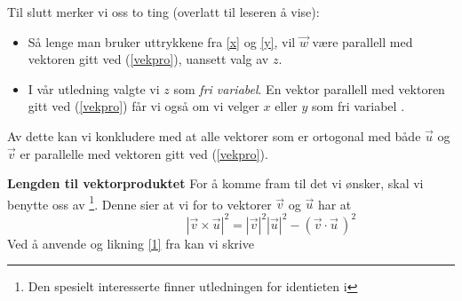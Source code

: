 {Til slutt merker vi oss to ting (overlatt til leseren å vise):
\begin{itemize}
\item Så lenge man bruker uttrykkene fra \eqref{x} og \eqref{y}, vil $ \vec{w} $ være parallell med vektoren gitt ved (\ref{vekpro}), uansett valg av $ z $.
\item I vår utledning valgte vi $z$ som \textit{fri variabel}. En vektor parallell med vektoren gitt ved (\ref{vekpro}) får vi også om vi velger $ x $ eller $ y $ som fri variabel .
\end{itemize}
\label{allekrypropar} Av dette kan vi konkludere med at alle vektorer som er ortogonal med både $ \vec{u} $ og $ \vec{v} $ er parallelle med vektoren gitt ved (\ref{vekpro}). \vsk

\textbf{Lengden til vektorproduktet}\os
For å komme fram til det vi ønsker, skal vi benytte oss av \footnote{Den spesielt interesserte finner utledningen for identieten i }. Denne sier at vi for to vektorer
$ \vec{v} $ og $ \vec{u} $ har at
\[\phantom{testingcloservl} |\vec{v}\times\vec{u}|^2=|\vec{v}|^2|\vec{u}|^2-(\vec{v}\cdot\vec{u}\,)^2 \tag{Lagranges identitet}\]
Ved å anvende  og likning \eqref{1} fra  kan vi skrive 
}
